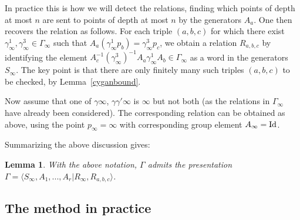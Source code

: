 \documentclass{article}[12pt]
\newtheorem{lem}{Lemma}%
\begin{document}
In practice this is how we will detect the relations, finding which points of depth at most $n$ are sent to points of depth at most $n$ by the generators $A_a$. One then recovers the relation as follows. For each triple $(a,b,c)$ for which there exist $\gamma_\infty^1,\gamma_\infty^3 \in\Gamma_\infty$ such that $A_a (\gamma_\infty^1 p_b) = \gamma_\infty^3 p_c$, we obtain a relation $R_{a,b,c}$ by identifying the element $A_c^{-1}(\gamma_\infty^3)^{-1}A_a\gamma_\infty^1A_b \in \Gamma_\infty$ as a word in the generators $S_\infty$.  
The key point is that there are only finitely many such triples $(a,b,c)$ to be checked, by Lemma~\ref{cyganbound}.

Now assume that one of $\gamma \infty$, $\gamma \gamma' \infty$ is $\infty$ but not both (as the relations in $\Gamma_\infty$ have already been considered). The corresponding relation can be obtained as above, using the point $p_\infty=\infty$ with corresponding group element $A_\infty = {\rm Id}$.


Summarizing the above discussion gives:

\begin{lem}\label{pres2} With the above notation, $\Gamma$ admits the presentation
 $\Gamma=\langle S_\infty,A_1,...,A_r \vert R_\infty, R_{a,b,c} \rangle$.
\end{lem}
 
\subsection{The method in practice}\label{method}
\end{document}
